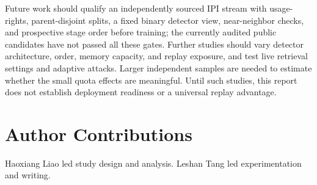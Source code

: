 \documentclass[conference]{IEEEtran}
\begin{document}
Future work should qualify an independently sourced IPI stream with usage-rights, parent-disjoint splits, a fixed binary detector view, near-neighbor checks, and prospective stage order before training; the currently audited public candidates have not passed all these gates. Further studies should vary detector architecture, order, memory capacity, and replay exposure, and test live retrieval settings and adaptive attacks. Larger independent samples are needed to estimate whether the small quota effects are meaningful. Until such studies, this report does not establish deployment readiness or a universal replay advantage.

\section*{Author Contributions}
Haoxiang Liao led study design and analysis. Leshan Tang led experimentation and writing.

\clearpage


\end{document}
